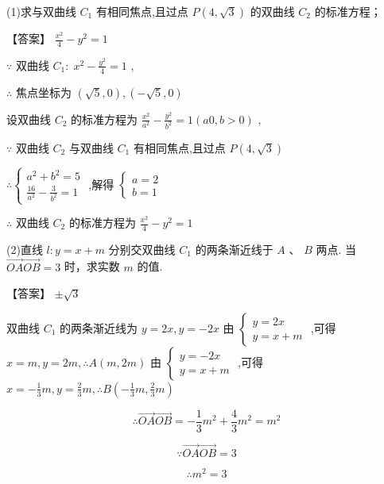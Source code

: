 \documentclass[10pt]{article}
\begin{document}
(1)求与双曲线 \({C}_{1}\) 有相同焦点,且过点 \(P\left( {4,\sqrt{3}}\right)\) 的双曲线 \({C}_{2}\) 的标准方程；

【答案】 \(\frac{{x}^{2}}{4} - {y}^{2} = 1\)

\(\because\) 双曲线 \({C}_{1} : \;{x}^{2} - \frac{{y}^{2}}{4} = 1\) ,

\(\therefore\) 焦点坐标为 \(\left( {\sqrt{5},0}\right) ,\left( {-\sqrt{5},0}\right)\)

设双曲线 \({C}_{2}\) 的标准方程为 \(\frac{{x}^{2}}{{a}^{2}} - \frac{{y}^{2}}{{b}^{2}} = 1\left( {{a0},b > 0}\right)\) ,

\(\because\) 双曲线 \({C}_{2}\) 与双曲线 \({C}_{1}\) 有相同焦点,且过点 \(P\left( {4,\sqrt{3}}\right)\)

\(\therefore \left\{  \begin{array}{l} {a}^{2} + {b}^{2} = 5 \\  \frac{16}{{a}^{2}} - \frac{3}{{b}^{2}} = 1 \end{array}\right.\) ,解得 \(\left\{  \begin{array}{l} a = 2 \\  b = 1 \end{array}\right.\)

\(\therefore\) 双曲线 \({C}_{2}\) 的标准方程为 \(\frac{{x}^{2}}{4} - {y}^{2} = 1\)

(2)直线 \(l : y = x + m\) 分别交双曲线 \({C}_{1}\) 的两条渐近线于 \(A\) 、 \(B\) 两点. 当 \(\overrightarrow{OA}\overrightarrow{OB} = 3\) 时，求实数 \(m\) 的值.

【答案】 \(\pm  \sqrt{3}\)

双曲线 \({C}_{1}\) 的两条渐近线为 \(y = {2x},y =  - {2x}\) 由 \(\left\{  \begin{array}{l} y = {2x} \\  y = x + m \end{array}\right.\) ,可得 \(x = m,y = {2m},\therefore A\left( {m,{2m}}\right)\) 由 \(\left\{  \begin{array}{l} y =  - {2x} \\  y = x + m \end{array}\right.\) ,可得 \(x =  - \frac{1}{3}m,y = \frac{2}{3}m,\therefore B\left( {-\frac{1}{3}m,\frac{2}{3}m}\right)\)

\[
\therefore \overrightarrow{OA}\overrightarrow{OB} =  - \frac{1}{3}{m}^{2} + \frac{4}{3}{m}^{2} = {m}^{2}
\]

\[
\because \overrightarrow{OA}\overrightarrow{OB} = 3
\]

\[
\therefore {m}^{2} = 3
\]
\end{document}
